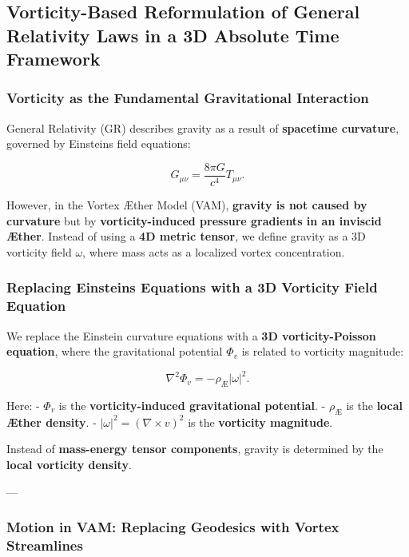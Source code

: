 
\subsection{Vorticity-Based Reformulation of General Relativity Laws in a 3D Absolute Time Framework}

\subsubsection*{Vorticity as the Fundamental Gravitational Interaction}

General Relativity (GR) describes gravity as a result of \textbf{spacetime curvature}, governed by Einstein\rqs s field equations:

\begin{equation*}
    G_{\mu\nu} = \frac{8\pi G}{c^4} T_{\mu\nu}.
\end{equation*}

However, in the Vortex Æther Model (VAM), \textbf{gravity is not caused by curvature} but by \textbf{vorticity-induced pressure gradients in an inviscid Æther}. Instead of using a \textbf{4D metric tensor}, we define gravity as a 3D vorticity field \( \omega \), where mass acts as a localized vortex concentration.

\subsubsection*{Replacing Einstein\rqs s Equations with a 3D Vorticity Field Equation}

We replace the Einstein curvature equations with a \textbf{3D vorticity-Poisson equation}, where the gravitational potential \( \Phi_v \) is related to vorticity magnitude:

\begin{equation*}
    \nabla^2 \Phi_v = - \rho_\text{Æ} |\omega|^2.
\end{equation*}

Here:
- \( \Phi_v \) is the \textbf{vorticity-induced gravitational potential}.
- \( \rho_\text{Æ} \) is the \textbf{local Æther density}.
- \( |\omega|^2 = (\nabla \times v)^2 \) is the \textbf{vorticity magnitude}.

Instead of \textbf{mass-energy tensor components}, gravity is determined by the \textbf{local vorticity density}.

---

\subsubsection*{Motion in VAM: Replacing Geodesics with Vortex Streamlines}

